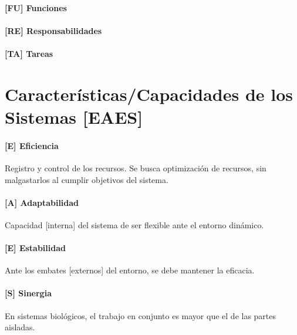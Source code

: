 \paragraph{{[}FU{]} Funciones}
\paragraph{{[}RE{]} Responsabilidades}
\paragraph{{[}TA{]} Tareas}


\hypertarget{caracteruxedsticas-de-los-sistemas-eaes}{%
\section{Características/Capacidades  de los Sistemas
{[}EAES{]}}\label{caracteruxedsticas-de-los-sistemas-eaes}}

\hypertarget{eficiencia}{%
\paragraph{{[}E{]} Eficiencia}\label{eficiencia}}
Registro y control de los recursos. Se busca optimización de recursos, sin malgastarlos al cumplir objetivos del sistema.
\hypertarget{adaptabilidad}{%
\paragraph{{[}A{]} Adaptabilidad}\label{adaptabilidad}}
Capacidad [interna] del sistema de ser flexible ante el  entorno dinámico.
\hypertarget{estabilidad}{%
\paragraph{{[}E{]} Estabilidad}\label{estabilidad}}
Ante los embates [externos] del entorno, se debe mantener la eficacia.
\hypertarget{sinergia}{%
\paragraph{{[}S{]} Sinergia}\label{sinergia}}
En sistemas biológicos, el trabajo en conjunto es mayor que el de las partes aisladas.


